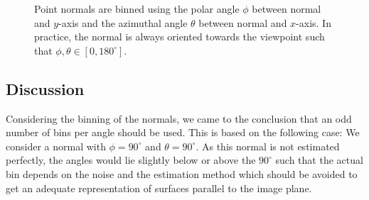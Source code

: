 \begin{figure}
	\caption[Illustration of the binning of normal orientation into histograms.]{Point normals are binned using the polar angle $\phi$ between normal and $y$-axis and the azimuthal angle $\theta$ between normal and $x$-axis. In practice, the normal is always oriented towards the viewpoint such that $\phi, \theta \in [0,180^\circ]$.}
	\label{fig:seeds-depth-normal-histograms-angles}
\end{figure}

\subsection{Discussion}
\label{subsection:deeds-depth-normal-histograms-discussion}

Considering the binning of the normals, we came to the conclusion that an odd number of bins per angle should be used. This is based on the following case: We consider a normal with $\phi = 90^\circ$ and $\theta = 90^\circ$. As this normal is not estimated perfectly, the angles would lie slightly below or above the $90^\circ$ such that the actual bin depends on the noise and the estimation method which should be avoided to get an adequate representation of surfaces parallel to the image plane.

